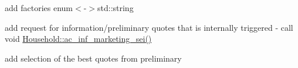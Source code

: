 
\begin{DoxyRefList}
\item[\label{_dev_stage1__DevStage1000009}%
\hypertarget{_dev_stage1__DevStage1000009}{}%
Member \hyperlink{namespacesolar__core_aa1147341e5ef7a40d68d1bd68e149362}{solar\+\_\+core\+:\+:E\+Param\+Types} ]add factories enum$<$-\/$>$std\+::string 
\item[\label{_dev_stage1__DevStage1000002}%
\hypertarget{_dev_stage1__DevStage1000002}{}%
Member \hyperlink{classsolar__core_1_1_household_a1e7d20a60dc42b8d09a8d23a4cdb26a6}{solar\+\_\+core\+:\+:Household\+:\+:act\+\_\+tick} ()]add request for information/preliminary quotes that is internally triggered -\/ call void \hyperlink{classsolar__core_1_1_household_add38a49b76c2836a50a89e75318414f1}{Household\+::ac\+\_\+inf\+\_\+marketing\+\_\+sei()} 

add selection of the best quotes from preliminary 


\end{DoxyRefList}
